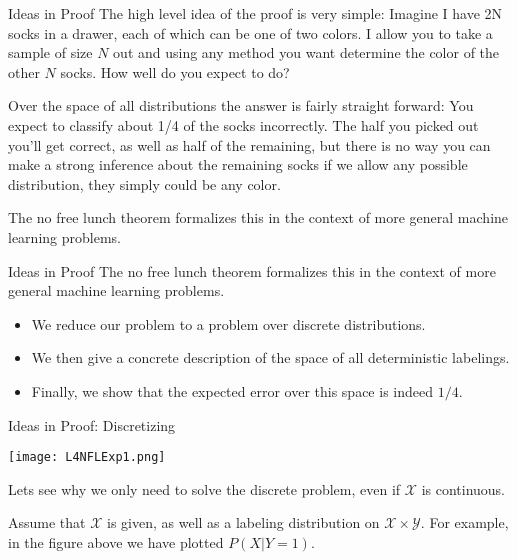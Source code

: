 \documentclass[10pt, table, dvipsnames,handout]{beamer}
\begin{document}
\begin{frame}[fragile]{Ideas in Proof}
The high level idea of the proof is very simple: Imagine I have 2N socks in a drawer, each of which can be one of two colors. I allow you to take a sample of size $N$ out and using any method you want determine the color of the other $N$ socks. How well do you expect to do?

Over the space of all distributions the answer is fairly straight forward: You expect to classify about 1/4 of the socks incorrectly. The half you picked out you'll get correct, as well as half of the remaining, but there is no way you can make a strong inference about the remaining socks if we allow any possible distribution, they simply could be any color. 

The no free lunch theorem formalizes this in the context of more general machine learning problems. 
\end{frame}




\begin{frame}[fragile]{Ideas in Proof}
The no free lunch theorem formalizes this in the context of more general machine learning problems. 

\begin{itemize}
\item We reduce our problem to a problem over discrete distributions.  \pause
\item We then give a concrete description of the space of all deterministic labelings. \pause
\item Finally, we show that the expected error over this space is indeed $1/4$. 
\end{itemize}


\end{frame}








\begin{frame}[fragile]{Ideas in Proof: Discretizing}
  \begin{minipage}[t][0.5\textheight][t]{\textwidth}
	  \centering \texttt{[image: L4NFLExp1.png]}
  \end{minipage}
  \vfill
  \begin{minipage}[t][0.5\textheight][t]{\textwidth}
Lets see why we only need to solve the discrete problem, even if $\mathcal{X}$ is continuous.

Assume that $\mathcal{X}$ is given, as well as a labeling distribution on $\mathcal{X}\times \mathcal{Y}$. For example, in the figure above we have plotted $P(X|Y = 1)$. 

\end{minipage}

\end{frame}
\end{document}
